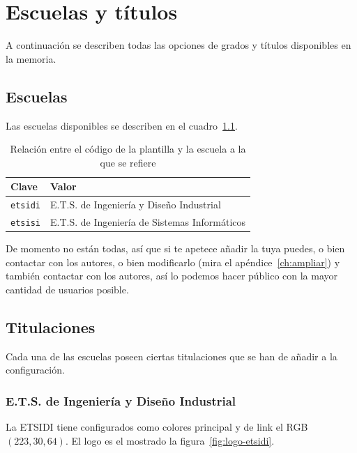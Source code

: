 \chapter{Escuelas y títulos}
\label{ch:escuelas-y-titulos}

A continuación se describen todas las opciones de grados y títulos disponibles en la memoria.

\section{Escuelas}

Las escuelas disponibles se describen en el cuadro~\ref{tbl:schools}.

\begin{table}[h]
    \centering
    \begin{tabularx}{\textwidth}{@{}lX@{}}
        \toprule
        \textbf{Clave}  & \textbf{Valor} \\
        \midrule
        \texttt{etsidi} & E.T.S. de Ingeniería y Diseño Industrial \\
        \texttt{etsisi} & E.T.S. de Ingeniería de Sistemas Informáticos \\
        \bottomrule
    \end{tabularx}
    \caption{\label{tbl:schools} Relación entre el código de la plantilla y la escuela a la que se refiere}
\end{table}

De momento no están todas, así que si te apetece añadir la tuya puedes, o bien contactar con los autores, o bien modificarlo (mira el apéndice~\ref{ch:ampliar}) y también contactar con los autores, así lo podemos hacer público con la mayor cantidad de usuarios posible.

\section{Titulaciones}

Cada una de las escuelas poseen ciertas titulaciones que se han de añadir a la configuración.

\subsection{E.T.S. de Ingeniería y Diseño Industrial}

La ETSIDI tiene configurados como colores principal y de link el RGB $(223,30,64)$. El logo es el mostrado la figura~\ref{fig:logo-etsidi}.

